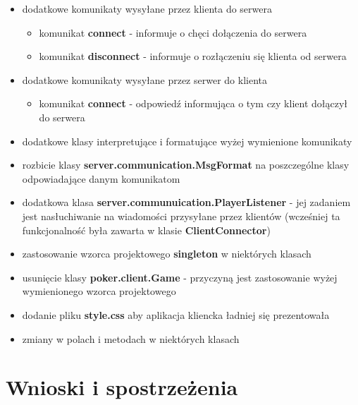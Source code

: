 \documentclass{article}
\begin{document}
    \begin{itemize}
        \item dodatkowe komunikaty wysyłane przez klienta do serwera
        \begin{itemize}
            \item komunikat \textbf{connect} - informuje o chęci dołączenia do serwera
            \item komunikat \textbf{disconnect} - informuje o rozłączeniu się klienta od serwera
        \end{itemize}
        \item dodatkowe komunikaty wysyłane przez serwer do klienta
        \begin{itemize}
            \item komunikat \textbf{connect} - odpowiedź informująca o tym czy klient dołączył do serwera
        \end{itemize}
        \item dodatkowe klasy interpretujące i formatujące wyżej wymienione komunikaty
        \item rozbicie klasy \textbf{server.communication.MsgFormat} na poszczególne klasy odpowiadające danym komunikatom
        \item dodatkowa klasa \textbf{server.communuication.PlayerListener} - jej zadaniem jest nasłuchiwanie na wiadomości przysyłane przez klientów (wcześniej ta funkcjonalność była zawarta w klasie \textbf{ClientConnector})
        \item zastosowanie wzorca projektowego \textbf{singleton} w niektórych klasach
        \item usunięcie klasy \textbf{poker.client.Game} - przyczyną jest zastosowanie wyżej wymienionego wzorca projektowego
        \item dodanie pliku \textbf{style.css} aby aplikacja kliencka ładniej się prezentowała
        \item zmiany w polach i metodach w niektórych klasach
    \end{itemize}


\section{Wnioski i spostrzeżenia}
\end{document}
